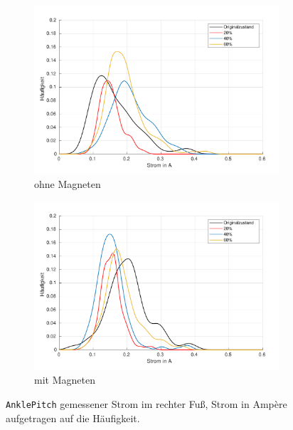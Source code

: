 \begin{figure}[tb]
	\centering
		\begin{subfigure}[c]{.9\linewidth}
			\centering
			\includegraphics[width=\linewidth]{Bilder/rechts_Current_AnklePitch_ohneM.pdf}
			\caption{ohne Magneten}
		\end{subfigure}
		\hfill
		\begin{subfigure}[c]{.9\linewidth}
			\centering
			\includegraphics[width=\linewidth]{Bilder/rechts_Current_AnklePitch_mitM.pdf}
			\caption{mit Magneten}
		\end{subfigure}
	\caption{\texttt{AnklePitch} gemessener Strom im rechter Fuß, Strom in Ampère aufgetragen auf die Häufigkeit.} \label{AnklePitch_Current_rechts}
\end{figure}

